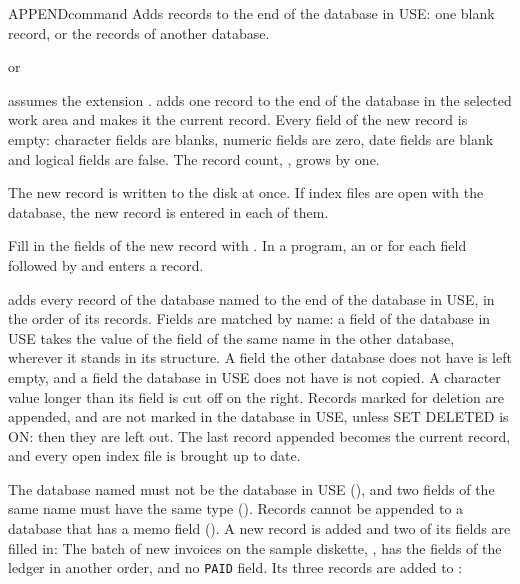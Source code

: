 \begin{XbaseEntry}{APPEND}{command}
Adds records to the end of the database in USE: one blank record, or the
records of another database.
\Syntax
{}
\par or\par
{}
\Defaults
{} assumes the extension .
\Usage
{} adds one record to the end of the database in the selected
work area and makes it the current record.  Every field of the new record is
empty: character fields are blanks, numeric fields are zero, date fields are
blank and logical fields are false.  The record count, , grows
by one.

The new record is written to the disk at once.  If index files are open with
the database, the new record is entered in each of them.

Fill in the fields of the new record with .  In a program, an
 or  for each field followed by  and
 enters a record.

 adds every record of the database named to the end of the
database in USE, in the order of its records.  Fields are matched by name:
a field of the database in USE takes the value of the field of the same name
in the other database, wherever it stands in its structure.  A field the
other database does not have is left empty, and a field the database in USE
does not have is not copied.  A character value longer than its field is cut
off on the right.  Records marked for deletion are appended, and are not
marked in the database in USE, unless SET DELETED is ON: then they are left
out.  The last record appended becomes the current record, and every open
index file is brought up to date.

The database named must not be the database in USE
(), and two fields of the same name must have
the same type ().  Records cannot be appended to
a database that has a memo field ().
\Examples
A new record is added and two of its fields are filled in:
The batch of new invoices on the sample diskette, , has the
fields of the ledger in another order, and no \texttt{PAID} field.  Its three
records are added to :
\end{XbaseEntry}

